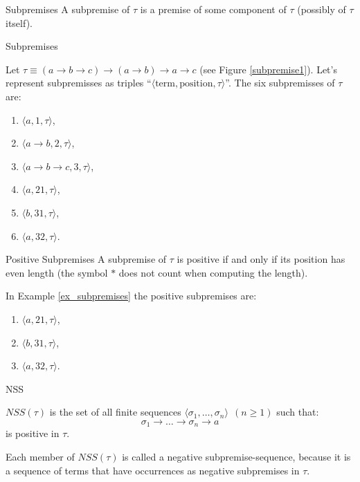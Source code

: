 \begin{frame}{Subpremises}
    A subpremise of $\tau$ is a premise of some component of $\tau$ (possibly of $\tau$ itself).
\end{frame}

\begin{frame}{Subpremises}
    \begin{exa}
    \label{ex_subpremises}
    Let $\tau \equiv (a \rightarrow b \rightarrow c) \rightarrow (a \rightarrow b) \rightarrow a \rightarrow c$ (see Figure \ref{subpremise1}). Let's represent subpremisses as triples ``$\langle \text{term}, \text{position}, \tau  \rangle$''. The six subpremisses of $\tau$ are: 
    \begin{enumerate}
        \item $\langle a, 1, \tau \rangle$,
        \item $\langle a \rightarrow b, 2, \tau \rangle$,
        \item $\langle a \rightarrow b \rightarrow c, 3, \tau \rangle$, 
        \item $\langle a, 21, \tau \rangle$,
        \item $\langle b, 31, \tau \rangle$,
        \item $\langle a, 32, \tau \rangle$. 
    \end{enumerate}
    \end{exa}
\end{frame}

\begin{frame}{Positive Subpremises}
    A subpremise of $\tau$ is positive if and only if its position has even length (the symbol $*$ does not count when computing the length). 
    
    \medskip 
    
    In Example \ref{ex_subpremises} the positive subpremises are: 
    \begin{enumerate}
        \item $\langle a, 21, \tau \rangle$,
        \item $\langle b, 31, \tau \rangle$,
        \item $\langle a, 32, \tau \rangle$.
    \end{enumerate}
    
\end{frame}

\begin{frame}{NSS}
\begin{mydef}
$NSS(\tau)$ is the set of all finite sequences 
$\langle \sigma_1, \ldots, \sigma_n \rangle \ \ (n \geq 1)$ such that: 
\begin{equation}
    \sigma_1 \rightarrow \ldots \rightarrow \sigma_n \rightarrow a
\end{equation} 
is positive in $\tau$. 
\end{mydef}

\begin{remark}
Each member of $NSS(\tau)$ is called a negative subpremise-sequence, because it is a sequence of terms that have occurrences as negative subpremises in $\tau$.  
\end{remark}
\end{frame}

